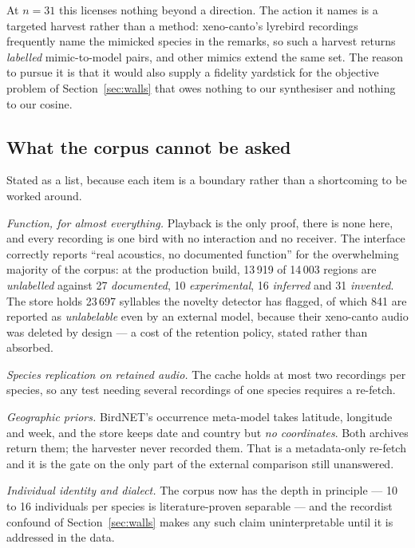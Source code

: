 \documentclass[10pt,twocolumn,a4paper]{article}
\begin{document}
At $n = 31$ this licenses nothing beyond a direction. The action it names is a targeted
harvest rather than a method: xeno-canto's lyrebird recordings frequently name the mimicked
species in the remarks, so such a harvest returns \emph{labelled} mimic-to-model pairs, and
other mimics extend the same set. The reason to pursue it is that it would also supply a
fidelity yardstick for the objective problem of Section~\ref{sec:walls} that owes nothing to
our synthesiser and nothing to our cosine.

\subsection{What the corpus cannot be asked}

Stated as a list, because each item is a boundary rather than a shortcoming to be worked
around.

\emph{Function, for almost everything.} Playback is the only proof, there is none here, and
every recording is one bird with no interaction and no receiver. The interface correctly
reports ``real acoustics, no documented function'' for the overwhelming majority of the
corpus: at the production build, 13\,919 of 14\,003 regions are \emph{unlabelled} against 27
\emph{documented}, 10 \emph{experimental}, 16 \emph{inferred} and 31 \emph{invented}. The
store holds 23\,697 syllables the novelty detector has flagged, of which 841 are reported as
\emph{unlabelable} even by an external model, because their xeno-canto audio was deleted by
design --- a cost of the retention policy, stated rather than absorbed.

\emph{Species replication on retained audio.} The cache holds at most two recordings per
species, so any test needing several recordings of one species requires a re-fetch.

\emph{Geographic priors.} BirdNET's occurrence meta-model takes latitude, longitude and week,
and the store keeps date and country but \emph{no coordinates}. Both archives return them; the
harvester never recorded them. That is a metadata-only re-fetch and it is the gate on the only
part of the external comparison still unanswered.

\emph{Individual identity and dialect.} The corpus now has the depth in principle --- 10 to 16
individuals per species is literature-proven separable --- and the recordist confound of
Section~\ref{sec:walls} makes any such claim uninterpretable until it is addressed in the data.
\end{document}

